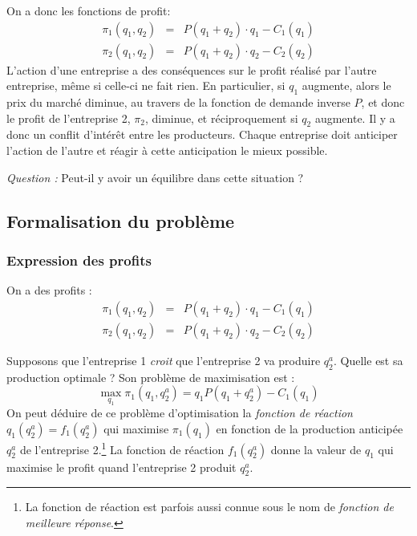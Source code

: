 \documentclass[
]{book}
\theoremstyle{definition}
\theoremstyle{definition}
\theoremstyle{definition}
\theoremstyle{definition}
\theoremstyle{remark}
\begin{document}
On a donc les fonctions de profit:
\[
\begin{array}{rcl}
\pi_1(q_1, q_2) &=& P(q_1+q_2)\cdot q_1-C_1(q_1)\\
\pi_2(q_1, q_2) &=& P(q_1+q_2)\cdot q_2-C_2(q_2)
\end{array}
\]
L'action d'une entreprise a des conséquences sur le profit réalisé par l'autre entreprise, même si celle-ci ne fait rien.
En particulier, si \(q_1\) augmente, alors le prix du marché diminue, au travers de la fonction de demande inverse \(P\), et donc le profit de l'entreprise 2, \(\pi_2\), diminue, et réciproquement si \(q_2\) augmente.
Il y a donc un conflit d'intérêt entre les producteurs.
Chaque entreprise doit anticiper l'action de l'autre et réagir à cette anticipation le mieux possible.

\emph{Question :} Peut-il y avoir un équilibre dans cette situation ?

\hypertarget{formalisation-du-probluxe8me}{%
\subsection{Formalisation du problème}\label{formalisation-du-probluxe8me}}

\hypertarget{expression-des-profits}{%
\subsubsection{Expression des profits}\label{expression-des-profits}}

On a des profits :
\[
\begin{array}{rcl}
\pi_1(q_1, q_2) &=& P(q_1+q_2)\cdot q_1-C_1(q_1)\\
\pi_2(q_1, q_2) &=& P(q_1+q_2)\cdot q_2-C_2(q_2)
\end{array}
\label{eq:profitcournot}
\]

Supposons que l'entreprise 1 \emph{croit} que l'entreprise 2 va produire \(q_2^a\).
Quelle est sa production optimale ?
Son problème de maximisation est :
\[
\max_{q_1} \pi_1(q_1, q_2^a) =  q_1P(q_1+q_2^a)-C_1(q_1)
\]
On peut déduire de ce problème d'optimisation la \emph{fonction de réaction} \(q_1(q_2^a)=f_1(q_2^a)\) qui maximise \(\pi_1(q_1)\) en fonction de la production anticipée \(q_2^a\) de l'entreprise 2.\footnote{La fonction de réaction est parfois aussi connue sous le nom de \emph{fonction de meilleure réponse}.}
La fonction de réaction \(f_1(q_2^a)\) donne la valeur de \(q_1\) qui maximise le profit quand l'entreprise 2 produit \(q_2^a\).
\end{document}
